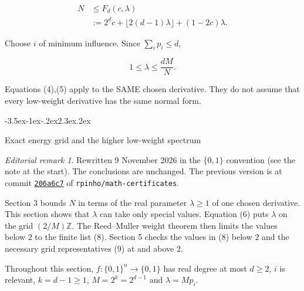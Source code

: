 \documentclass[11pt]{article}
\makeatletter
\renewcommand\section{\@startsection{section}{1}{\z@}
  {-3.5ex\@plus -1ex\@minus -.2ex}{2.3ex\@plus .2ex}
  {\normalfont\Large\bfseries\raggedright}}
\theoremstyle{remark}
\newtheorem*{editorial}{Editorial remark}
\theoremstyle{correctionstyle}
\makeatother
\begin{document}
\begin{equation}
\begin{aligned}N&\le F_d(c,\lambda)\\
&:=2^dc+\lfloor2(d-1)\lambda\rfloor+(1-2c)\lambda.\end{aligned}\tag{4}
\label{src-p038}
\end{equation}

\leavevmode\label{src-p039}Choose $i$ of minimum influence. Since $\sum_i p_i\le d$,\label{src-end-p039}\par

\begin{equation}
1\le\lambda\le\frac{dM}{N}.\tag{5}
\label{src-p040}
\end{equation}

\leavevmode\label{src-p041}Equations (4),(5) apply to the SAME chosen derivative. They do not assume
that every low-weight derivative has the same normal form.\label{src-end-p041}\par

\section{Exact energy grid and the higher low-weight spectrum}\label{src-p042}\label{src-end-p042}

\begin{editorial}
Rewritten 9 November 2026 in the $\{0,1\}$ convention (see the note at the
start). The conclusions are unchanged. The previous version
is at commit \href{https://github.com/rpinho/math-certificates/tree/206a6c7}{\texttt{206a6c7}}
of \texttt{rpinho/math-certificates}.
\end{editorial}
Section 3 bounds $N$ in terms of the real parameter $\lambda\ge1$ of one chosen
derivative. This section shows that $\lambda$ can take only special values.
Equation (6) puts $\lambda$ on the grid $(2/M)\mathbb Z$. The Reed--Muller weight
theorem then limits the values below $2$ to the finite list (8). Section 5
checks the values in (8) below $2$ and the necessary grid representatives (9) at
and above $2$.

\label{src-p043}\label{src-end-p043}\label{src-p044}\label{src-end-p044}\label{src-p045}\label{src-end-p045}%
\leavevmode Throughout this section, $f:\{0,1\}^n\to\{0,1\}$ has real degree at most
$d\ge2$, $i$ is relevant, $k=d-1\ge1$, $M=2^k=2^{d-1}$ and $\lambda=Mp_i$.
\end{document}
